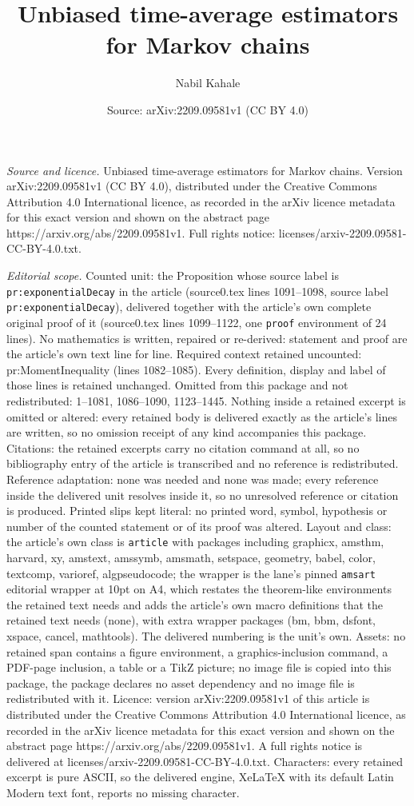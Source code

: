 \documentclass[10pt,a4paper]{amsart}
\title[Unbiased time-average estimators for Markov chains]{Unbiased time-average estimators for Markov chains}
\author{Nabil Kahale}
\date{Source: arXiv:2209.09581v1 (CC BY 4.0)}
\begin{document}
\maketitle

\noindent\emph{Source and licence.} Unbiased time-average estimators for Markov chains. Version arXiv:2209.09581v1 (CC BY 4.0), distributed under the Creative Commons Attribution 4.0 International licence, as recorded in the arXiv licence metadata for this exact version and shown on the abstract page https://arxiv.org/abs/2209.09581v1. Full rights notice: licenses/arxiv-2209.09581-CC-BY-4.0.txt.\par\smallskip

\noindent\textit{Editorial scope.} Counted unit: the Proposition whose source label is \texttt{pr:exponentialDecay} in the article (source0.tex lines 1091--1098, source label \texttt{pr:exponentialDecay}), delivered together with the article's own complete original proof of it (source0.tex lines 1099--1122, one \texttt{proof} environment of 24 lines). No mathematics is written, repaired or re-derived: statement and proof are the article's own text line for line. Required context retained uncounted: pr:MomentInequality (lines 1082--1085). Every definition, display and label of those lines is retained unchanged. Omitted from this package and not redistributed: 1--1081, 1086--1090, 1123--1445. Nothing inside a retained excerpt is omitted or altered: every retained body is delivered exactly as the article's lines are written, so no omission receipt of any kind accompanies this package. Citations: the retained excerpts carry no citation command at all, so no bibliography entry of the article is transcribed and no reference is redistributed. Reference adaptation: none was needed and none was made; every reference inside the delivered unit resolves inside it, so no unresolved reference or citation is produced. Printed slips kept literal: no printed word, symbol, hypothesis or number of the counted statement or of its proof was altered. Layout and class: the article's own class is \texttt{article} with packages including graphicx, amsthm, harvard, xy, amstext, amssymb, amsmath, setspace, geometry, babel, color, textcomp, varioref, algpseudocode; the wrapper is the lane's pinned \texttt{amsart} editorial wrapper at 10pt on A4, which restates the theorem-like environments the retained text needs and adds the article's own macro definitions that the retained text needs (none), with extra wrapper packages (bm, bbm, dsfont, xspace, cancel, mathtools). The delivered numbering is the unit's own. Assets: no retained span contains a figure environment, a graphics-inclusion command, a PDF-page inclusion, a table or a TikZ picture; no image file is copied into this package, the package declares no asset dependency and no image file is redistributed with it. Licence: version arXiv:2209.09581v1 of this article is distributed under the Creative Commons Attribution 4.0 International licence, as recorded in the arXiv licence metadata for this exact version and shown on the abstract page https://arxiv.org/abs/2209.09581v1. A full rights notice is delivered at licenses/arxiv-2209.09581-CC-BY-4.0.txt. Characters: every retained excerpt is pure ASCII, so the delivered engine, XeLaTeX with its default Latin Modern text font, reports no missing character.
\end{document}
